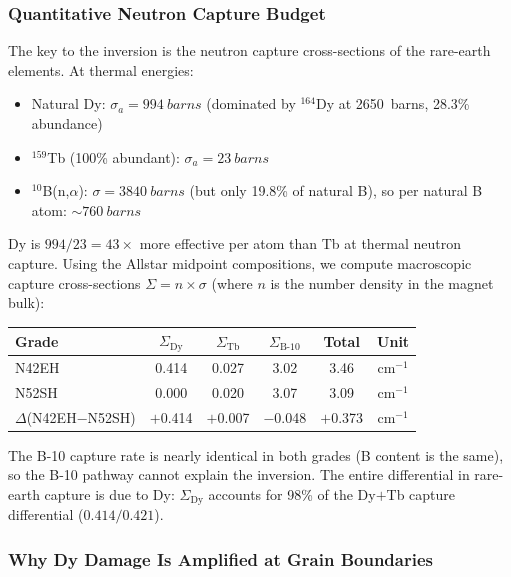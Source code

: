 \documentclass[11pt,letterpaper]{article}
\begin{document}
\subsubsection{Quantitative Neutron Capture Budget}

The key to the inversion is the neutron capture cross-sections of the
rare-earth elements. At thermal energies:
\begin{itemize}
    \item Natural Dy: $\sigma_a = \SI{994}{barns}$ (dominated by
    ${}^{164}$Dy at \SI{2650}{barns}, 28.3\% abundance)
    \item ${}^{159}$Tb (100\% abundant): $\sigma_a = \SI{23}{barns}$
    \item ${}^{10}$B(n,$\alpha$): $\sigma = \SI{3840}{barns}$ (but only
    19.8\% of natural B), so per natural B atom: $\sim\SI{760}{barns}$
\end{itemize}

Dy is $994/23 = 43\times$ more effective per atom than Tb at thermal neutron
capture. Using the Allstar midpoint compositions, we compute macroscopic
capture cross-sections $\Sigma = n \times \sigma$ (where $n$ is the number
density in the magnet bulk):

\begin{center}
\begin{tabular}{lccccc}
\toprule
Grade  & $\Sigma_\mathrm{Dy}$ & $\Sigma_\mathrm{Tb}$ & $\Sigma_\mathrm{B\text{-}10}$ & Total & Unit \\
\midrule
N42EH  & 0.414  & 0.027  & 3.02  & 3.46  & cm$^{-1}$ \\
N52SH  & 0.000  & 0.020  & 3.07  & 3.09  & cm$^{-1}$ \\
\midrule
$\Delta$(N42EH$-$N52SH) & $+$0.414 & $+$0.007 & $-$0.048 & $+$0.373 & cm$^{-1}$ \\
\bottomrule
\end{tabular}
\end{center}

The B-10 capture rate is nearly identical in both grades (B content is the
same), so the B-10 pathway cannot explain the inversion. The entire
differential in rare-earth capture is due to Dy: $\Sigma_\mathrm{Dy}$
accounts for 98\% of the Dy$+$Tb capture differential ($0.414/0.421$).

\subsubsection{Why Dy Damage Is Amplified at Grain Boundaries}
\end{document}
